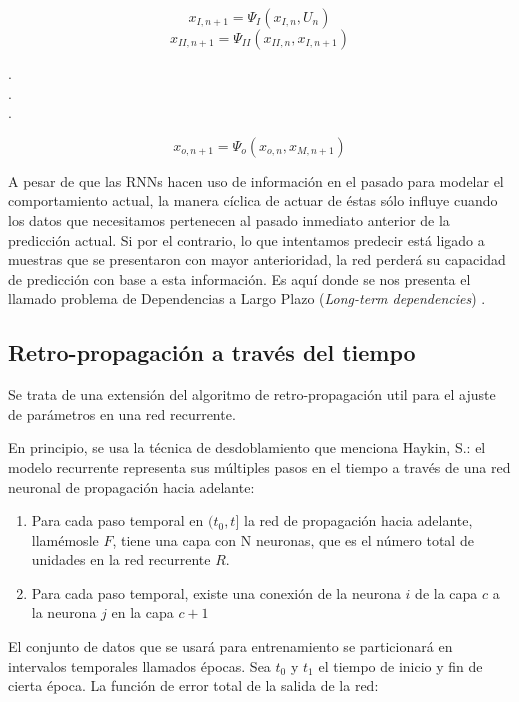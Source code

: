 \[x_{I,n+1} = \Psi_I(x_{I,n},U_{n})\]
\[x_{II,n+1} = \Psi_{II}(x_{II,n},x_{I,n+1})\]
\begin{center}
.\\
.\\
.\\  
\end{center}

\[x_{o,n+1} = \Psi_o(x_{o,n},x_{M,n+1})\]

A pesar de que las RNNs hacen uso de información en el pasado para modelar el comportamiento actual, la manera cíclica de actuar de éstas sólo influye cuando los datos que necesitamos pertenecen al pasado inmediato anterior de la predicción actual. Si por el contrario, lo que intentamos predecir está ligado a muestras que se presentaron con mayor anterioridad, la red perderá su capacidad de predicción con base a esta información. Es aquí donde se nos presenta el llamado problema de Dependencias a Largo Plazo  (\textit{Long-term dependencies}) \cite{understanding_lstm_Olah}. 

\subsection{Retro-propagación a través del tiempo}

Se trata de una extensión del algoritmo de retro-propagación util para el ajuste de parámetros en una red recurrente.

En principio, se usa la técnica de desdoblamiento que menciona Haykin, S.: \cite{haykin2008neural} el modelo recurrente representa sus múltiples pasos en el tiempo a través de una red neuronal de propagación hacia adelante:

\begin{enumerate}
    \item Para cada paso temporal en $(t_0,t]$ la red de propagación hacia adelante, llamémosle $F$, tiene una capa con N neuronas, que es el número total de unidades en la red recurrente $R$.

    \item Para cada paso temporal, existe una conexión de la neurona $i$ de la capa $c$ a la neurona $j$ en la capa $c+1$ 
\end{enumerate}

El conjunto de datos que se usará para entrenamiento se particionará en intervalos temporales llamados épocas. Sea $t_0$ y $t_1$ el tiempo de inicio y fin de cierta época. La función de error total de la salida de la red:


